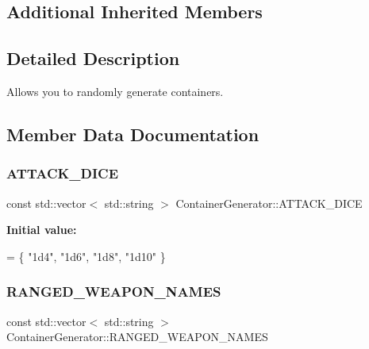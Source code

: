 \subsection*{Additional Inherited Members}


\subsection{Detailed Description}
Allows you to randomly generate containers. 

\subsection{Member Data Documentation}
\hypertarget{class_container_generator_a1687cedcd3075172234006f2354c347b}{}\label{class_container_generator_a1687cedcd3075172234006f2354c347b} 
\subsubsection{\texorpdfstring{A\+T\+T\+A\+C\+K\+\_\+\+D\+I\+CE}{ATTACK\_DICE}}
{\footnotesize\ttfamily const std\+::vector$<$ std\+::string $>$ Container\+Generator\+::\+A\+T\+T\+A\+C\+K\+\_\+\+D\+I\+CE\hspace{0.3cm}{\ttfamily [static]}}

{\bfseries Initial value\+:}
\begin{DoxyCode}
= \{
    \textcolor{stringliteral}{"1d4"},
    \textcolor{stringliteral}{"1d6"},
    \textcolor{stringliteral}{"1d8"},
    \textcolor{stringliteral}{"1d10"}
\}
\end{DoxyCode}
\hypertarget{class_container_generator_a569ad72c2beb309b35693d243595580f}{}\label{class_container_generator_a569ad72c2beb309b35693d243595580f} 
\subsubsection{\texorpdfstring{R\+A\+N\+G\+E\+D\+\_\+\+W\+E\+A\+P\+O\+N\+\_\+\+N\+A\+M\+ES}{RANGED\_WEAPON\_NAMES}}
{\footnotesize\ttfamily const std\+::vector$<$ std\+::string $>$ Container\+Generator\+::\+R\+A\+N\+G\+E\+D\+\_\+\+W\+E\+A\+P\+O\+N\+\_\+\+N\+A\+M\+ES\hspace{0.3cm}{\ttfamily [static]}}

